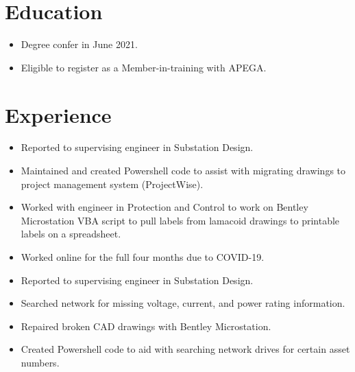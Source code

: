 \documentclass{lsanche_cv}
\begin{document}

\medskip


\smallskip


\begin{multicols*}{2}
  \section{Education}
    \begin{itemize}
      \item Degree confer in June 2021.
      \item Eligible to register as a Member-in-training with APEGA.
    \end{itemize}

  \section{Experience}
    \begin{itemize}
      \item Reported to supervising engineer in Substation Design.
      \item Maintained and created Powershell code to assist with migrating drawings to project management system (ProjectWise).
      \item Worked with engineer in Protection and Control to work on Bentley Microstation VBA script to pull labels from lamacoid drawings to printable labels on a spreadsheet.
      \item Worked online for the full four months due to COVID-19.
    \end{itemize}

    \divider

    \begin{itemize}
      \item Reported to supervising engineer in Substation Design.
      \item Searched network for missing voltage, current, and power rating information.
      \item Repaired broken CAD drawings with Bentley Microstation.
      \item Created Powershell code to aid with searching network drives for certain asset numbers.
    \end{itemize}


\end{multicols*}
\end{document}
